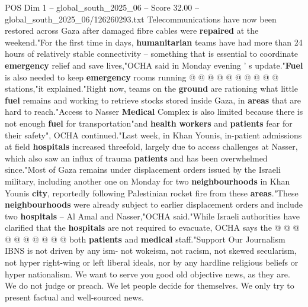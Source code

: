 \begin{textsample}{POS Dim 1 – global\_south\_2025\_06 – Score 32.00 – global\_south\_2025\_06/126260293.txt}
Telecommunications have now been restored across Gaza after damaged fibre cables were \textbf{repaired} at the weekend."For the first time in days, \textbf{humanitarian} teams have had more than 24 hours of relatively stable connectivity -- something that is essential to coordinate \textbf{emergency} relief and save lives,"OCHA said in Monday evening ' s update."\textbf{Fuel} is also needed to keep \textbf{emergency} rooms running @ @ @ @ @ @ @ @ @ @ stations,"it explained."Right now, teams on the \textbf{ground} are rationing what little \textbf{fuel} remains and working to retrieve stocks stored inside Gaza, in \textbf{areas} that are hard to reach."Access to Nasser \textbf{Medical} Complex is also limited because there is not enough \textbf{fuel} for transportation"and \textbf{health} \textbf{workers} and \textbf{patients} fear for their safety", OCHA continued."Last week, in Khan Younis, in-patient admissions at field \textbf{hospitals} increased threefold, largely due to access challenges at Nasser, which also saw an influx of trauma \textbf{patients} and has been overwhelmed since."Most of Gaza remains under displacement orders issued by the Israeli military, including another one on Monday for two \textbf{neighbourhoods} in Khan Younis \textbf{city}, reportedly following Palestinian rocket fire from these \textbf{areas}."These \textbf{neighbourhoods} were already subject to earlier displacement orders and include two \textbf{hospitals} -- Al Amal and Nasser,"OCHA said."While Israeli authorities have clarified that the \textbf{hospitals} are not required to evacuate, OCHA says the @ @ @ @ @ @ @ @ @ @ both \textbf{patients} and \textbf{medical} staff."Support Our Journalism IBNS is not driven by any ism- not wokeism, not racism, not skewed secularism, not hyper right-wing or left liberal ideals, nor by any hardline religious beliefs or hyper nationalism.
We want to serve you good old objective news, as they are.
We do not judge or preach.
We let people decide for themselves.
We only try to present factual and well-sourced news.

\end{textsample}
